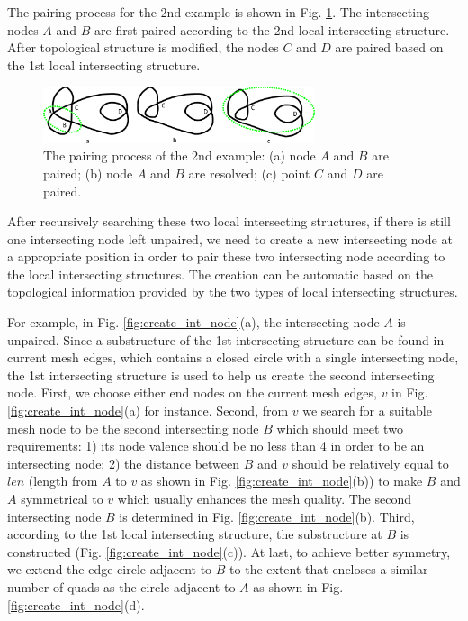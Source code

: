 \documentclass[final,5p,times,twocolumn]{elsarticle}
\begin{document}
The pairing process for the 2nd example is shown in Fig. \ref{fig:pair_int_exam2_proc}. The intersecting nodes $A$ and $B$ are first paired according to the 2nd local intersecting structure. After topological structure is modified, the nodes $C$ and $D$ are paired based on the 1st local intersecting structure.

\begin{figure}[htbp]
\begin{center}
\includegraphics[width=8cm]{pmexam2step.png}
\caption{The pairing process of the 2nd example: (a) node $A$ and $B$ are paired; (b) node $A$ and $B$ are resolved; (c) point $C$ and $D$ are paired.}
\label{fig:pair_int_exam2_proc}
\end{center}
\end{figure}

After recursively searching these two local intersecting structures, if there is still one intersecting node left unpaired, we need to create a new intersecting node at a appropriate position in order to pair these two intersecting node according to the local intersecting structures. The creation can be automatic based on the topological information provided by the two types of local intersecting structures.

For example, in Fig. \ref{fig:create_int_node}(a), the intersecting node $A$ is unpaired. Since a substructure of the 1st intersecting structure can be found in current mesh edges, which contains a closed circle with a single intersecting node, the 1st intersecting structure is used to help us create the second intersecting node. First, we choose either end nodes on the current mesh edges, $v$ in Fig. \ref{fig:create_int_node}(a) for instance. Second, from $v$ we search for a suitable mesh node to be the second intersecting node $B$ which should meet two requirements: 1) its node valence should be no less than 4 in order to be an intersecting node; 2) the distance between $B$ and $v$ should be relatively equal to $len$ (length from $A$ to $v$ as shown in Fig. \ref{fig:create_int_node}(b)) to make $B$ and $A$ symmetrical to $v$ which usually enhances the mesh quality. The second intersecting node $B$ is determined in Fig. \ref{fig:create_int_node}(b). Third, according to the 1st local intersecting structure, the substructure at $B$ is constructed (Fig. \ref{fig:create_int_node}(c)). At last, to achieve better symmetry, we extend the edge circle adjacent to $B$ to the extent that encloses a similar number of quads as the circle adjacent to $A$ as shown in Fig. \ref{fig:create_int_node}(d).
\end{document}
